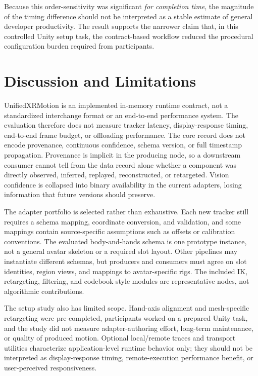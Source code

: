 \documentclass[runningheads]{llncs}
\begin{document}
Because this order-sensitivity was significant \emph{for completion time}, the magnitude of the timing difference should not be interpreted as a stable estimate of general developer productivity. The result supports the narrower claim that, in this controlled Unity setup task, the contract-based workflow reduced the procedural configuration burden required from participants.

\section{Discussion and Limitations}\label{sec:discussion-limitations}
UnifiedXRMotion is an implemented in-memory runtime contract, not a standardized interchange format or an end-to-end performance system. The evaluation therefore does not measure tracker latency, display-response timing, end-to-end frame budget, or offloading performance. The core record does not encode provenance, continuous confidence, schema version, or full timestamp propagation. Provenance is implicit in the producing node, so a downstream consumer cannot tell from the data record alone whether a component was directly observed, inferred, replayed, reconstructed, or retargeted. Vision confidence is collapsed into binary availability in the current adapters, losing information that future versions should preserve.

The adapter portfolio is selected rather than exhaustive. Each new tracker still requires a schema mapping, coordinate conversion, and validation, and some mappings contain source-specific assumptions such as offsets or calibration conventions. The evaluated body-and-hands schema is one prototype instance, not a general avatar skeleton or a required slot layout. Other pipelines may instantiate different schemas, but producers and consumers must agree on slot identities, region views, and mappings to avatar-specific rigs. The included IK, retargeting, filtering, and codebook-style modules are representative nodes, not algorithmic contributions.

The setup study also has limited scope. Hand-axis alignment and mesh-specific retargeting were pre-completed, participants worked on a prepared Unity task, and the study did not measure adapter-authoring effort, long-term maintenance, or quality of produced motion. Optional local/remote traces and transport utilities characterize application-level runtime behavior only; they should not be interpreted as display-response timing, remote-execution performance benefit, or user-perceived responsiveness.
\end{document}
